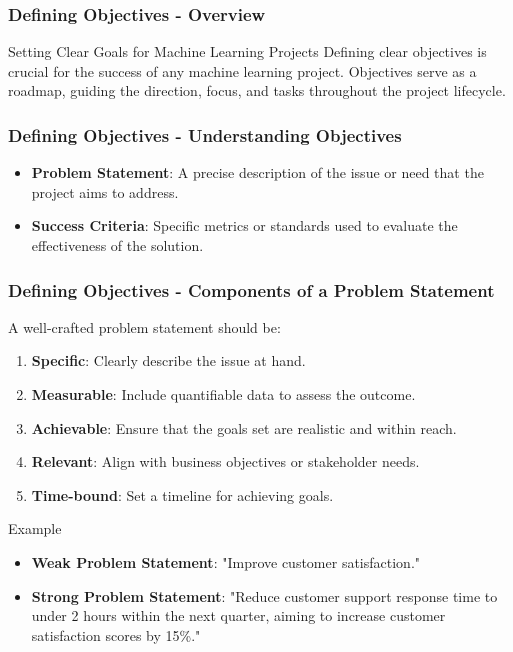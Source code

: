 \documentclass[aspectratio=169]{beamer}
\begin{document}
\begin{frame}[fragile]
    \frametitle{Defining Objectives - Overview}
    \begin{block}{Setting Clear Goals for Machine Learning Projects}
        Defining clear objectives is crucial for the success of any machine learning project. Objectives serve as a roadmap, guiding the direction, focus, and tasks throughout the project lifecycle.
    \end{block}
\end{frame}

\begin{frame}[fragile]
    \frametitle{Defining Objectives - Understanding Objectives}
    \begin{itemize}
        \item \textbf{Problem Statement}: A precise description of the issue or need that the project aims to address.
        \item \textbf{Success Criteria}: Specific metrics or standards used to evaluate the effectiveness of the solution.
    \end{itemize}
\end{frame}

\begin{frame}[fragile]
    \frametitle{Defining Objectives - Components of a Problem Statement}
    A well-crafted problem statement should be:
    \begin{enumerate}
        \item \textbf{Specific}: Clearly describe the issue at hand.
        \item \textbf{Measurable}: Include quantifiable data to assess the outcome.
        \item \textbf{Achievable}: Ensure that the goals set are realistic and within reach.
        \item \textbf{Relevant}: Align with business objectives or stakeholder needs.
        \item \textbf{Time-bound}: Set a timeline for achieving goals.
    \end{enumerate}
    \begin{block}{Example}
        \begin{itemize}
            \item \textbf{Weak Problem Statement}: "Improve customer satisfaction."
            \item \textbf{Strong Problem Statement}: "Reduce customer support response time to under 2 hours within the next quarter, aiming to increase customer satisfaction scores by 15\%."
        \end{itemize}
    \end{block}
\end{frame}
\end{document}
